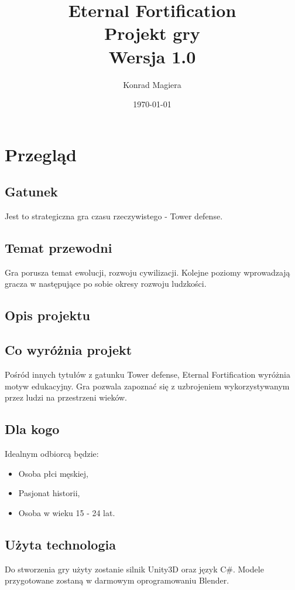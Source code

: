 \documentclass[a4paper,12pt, twoside, titlepage]{article}
\title{\Huge{\textbf{Eternal Fortification}}\\ \Large{Projekt gry}\\ \large{Wersja 1.0}}
\author{Konrad Magiera}
\date{\today}
\begin{document}
\maketitle
\newpage
{}
\tableofcontents
\newpage


\section{Przegląd}
\subsection{Gatunek}
Jest to strategiczna gra czasu rzeczywistego - Tower defense.

\subsection{Temat przewodni}
Gra porusza temat ewolucji, rozwoju cywilizacji. Kolejne poziomy wprowadzają gracza w następujące po sobie okresy rozwoju ludzkości.

\subsection{Opis projektu}


\subsection{Co wyróżnia projekt}
Pośród innych tytułów z gatunku Tower defense, Eternal Fortification wyróżnia motyw edukacyjny. Gra pozwala zapoznać się z uzbrojeniem wykorzystywanym przez ludzi na przestrzeni wieków.

\subsection{Dla kogo}
Idealnym odbiorcą będzie:
\begin{itemize}
	\item Osoba płci męskiej,
	\item Pasjonat historii,
	\item Osoba w wieku 15 - 24 lat.
\end{itemize}

\subsection{Użyta technologia}
Do stworzenia gry użyty zostanie silnik Unity3D oraz język C\#. Modele przygotowane zostaną w darmowym oprogramowaniu Blender.
\end{document}
